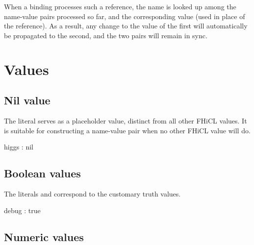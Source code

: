 \documentclass{memarticle}
\newcommand{\fhicl}%
 {FHiCL\xspace}
\begin{document}
When a binding processes such a reference,
the name is looked up
among the name-value pairs processed so far,
and the corresponding value
 (used in place of the reference).
As a result,
any change to the value of the first
will automatically be propagated to the second,
and the two pairs will remain in sync.


\chapter{Values}

%

\section{Nil value}

The literal 
serves as a placeholder value,
distinct from all other \fhicl values.
It is suitable for constructing a name-value pair
when no other \fhicl value will do.
\Needspace{0.17in}
\begin{fcllisting}[texcl,escapechar=`]
higgs : nil
\end{fcllisting}

\section{Boolean values}

The literals  and 
correspond to the customary truth values.
\Needspace{0.17in}
\begin{fcllisting}[texcl,escapechar=`]
debug : true
\end{fcllisting}

\section{Numeric values}
%
\end{document}

